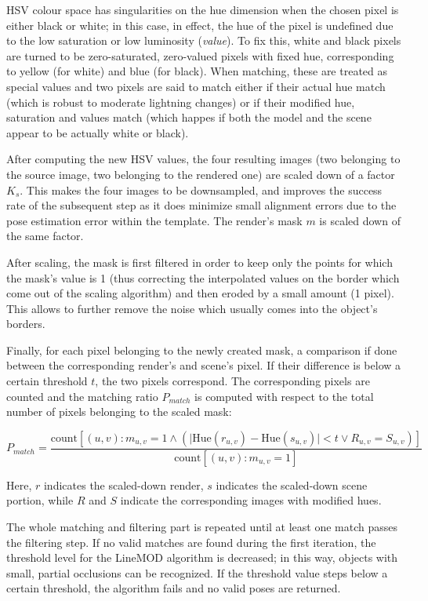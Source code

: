 HSV colour space has singularities on the hue dimension when the chosen pixel is
either black or white; in this case, in effect, the hue of the pixel is
undefined due to the low saturation or low luminosity (\emph{value}). To fix
this, white and black pixels are turned to be zero-saturated, zero-valued
pixels with fixed hue, corresponding to yellow (for white) and blue (for
black). When matching, these are treated as special values and two pixels are
said to match either if their actual hue match (which
is robust to moderate lightning changes) or if their modified hue, saturation
and values match
(which happes if both the model and the scene appear to be actually white or
black). 

After computing the new HSV values, the four resulting images (two belonging to
the source image, two belonging to the rendered one) are scaled down of a
factor $K_s$. This makes the four images to be downsampled, and improves the
success rate of the subsequent step as it does minimize small alignment errors
due to the pose estimation error within the template. The render's mask $m$ is
scaled down of the same factor.

After scaling, the mask is first filtered in order to keep only the points for
which the mask's value is 1 (thus correcting the interpolated values on the
border which come out of the scaling algorithm) and then
eroded by a small amount (1 pixel). This allows to further remove the noise
which usually comes into the object's borders.

Finally, for each pixel belonging to the newly created mask, a comparison if
done between the corresponding render's and scene's pixel. If their difference
is below a certain threshold $t$, the two pixels correspond. The corresponding
pixels are counted and the matching ratio $P_{match}$ is computed with respect to the
total number of pixels belonging to the scaled mask:

\begin{equation}
P_{match}=\frac{\text{count}\left[(u,v) : m_{u,v}=1 \wedge \left( \lvert
\text{Hue}(r_{u,v})-\text{Hue}(s_{u,v})\rvert < t \vee R_{u,v}=S_{u,v} \right)
\right]
}{\text{count}\left[ (u,v) : m_{u,v}=1 \right] }
\end{equation}

Here, $r$ indicates the scaled-down render, $s$ indicates the scaled-down scene
portion, while $R$ and $S$ indicate the corresponding images with modified hues.

The whole matching and filtering part is repeated until at least one match
passes the filtering step. If no valid matches are found during the first
iteration, the threshold level for the LineMOD algorithm is decreased; in this
way, objects with small, partial occlusions can be recognized. If the threshold
value steps below a certain threshold, the algorithm fails and no valid poses
are returned.

